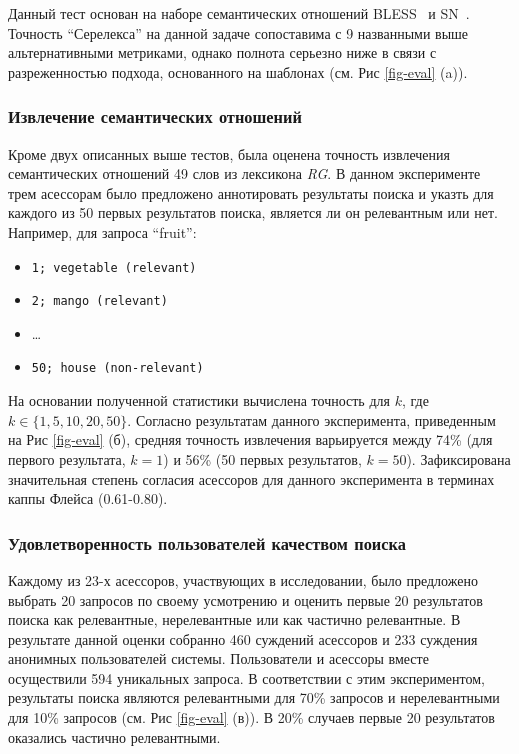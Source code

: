 \documentclass[a4paper,10pt,twoside]{article}
\begin{document}
Данный тест основан на наборе семантических отношений BLESS~\cite{baroniwe} и SN~\cite{panchenko2012study}. Точность "`Серелекса"' на данной задаче сопоставима с 9 названными выше альтернативными метриками, однако полнота серьезно ниже в связи с разреженностью подхода, основанного на шаблонах (см. Рис \ref{fig-eval} (a)).

\subsubsection{Извлечение семантических отношений} 

Кроме двух описанных выше тестов, была оценена точность извлечения семантических отношений 49 слов из лексикона \textit{RG}. В данном эксперименте трем асессорам было предложено аннотировать результаты поиска и указть для каждого из 50 первых результатов поиска, является ли он релевантным или нет. Например, для запроса ``fruit'':

\begin{itemize}
  \footnotesize
  \item \texttt{1; vegetable (relevant)}
  \item \texttt{2; mango (relevant)}
  \item \ldots
  \item \texttt{50; house (non-relevant)}
\end{itemize} 

На основании полученной статистики вычислена точность для $k$, где $k \in \{1, 5, 10, 20, 50\}$. Согласно результатам данного эксперимента, приведенным на Рис \ref{fig-eval} (б), средняя точность извлечения варьируется между 74\% (для первого результата, $k=1$) и 56\% (50 первых результатов, $k=50$). Зафиксирована значительная степень согласия асессоров для данного эксперимента в терминах каппы Флейса (0.61-0.80).


\subsubsection{Удовлетворенность пользователей качеством поиска} Каждому из 23-х асессоров, участвующих в исследовании, было предложено выбрать 20 запросов по своему усмотрению и оценить первые 20 результатов поиска как релевантные, нерелевантные или как частично релевантные. В результате данной оценки собранно 460 суждений асессоров и 233 суждения анонимных пользователей системы. Пользователи и асессоры вместе осуществили 594 уникальных запроса. В соответствии с этим экспериментом, результаты поиска являются релевантными для 70\% запросов и нерелевантными для 10\% запросов (см. Рис \ref{fig-eval} (в)). В 20\% случаев первые 20 результатов оказались частично релевантными.
\end{document}
